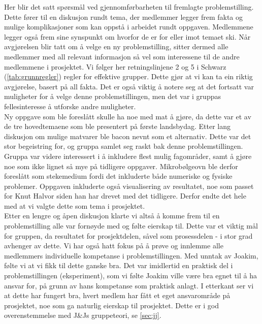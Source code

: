 Her blir det satt spørsmål ved gjennomførbarheten til fremlagte problemstilling. Dette
fører til en diskusjon rundt tema, der medlemmer legger frem fakta og mulige komplikasjoner 
som kan oppstå i arbeidet rundt oppgaven. Medlemmene legger også frem sine
synspunkt om hvorfor de er for eller imot temaet ski. Når avgjørelsen blir tatt
om å velge en ny problemstilling, sitter dermed alle medlemmer med all relevant informasjon så vel som interessene 
til de andre medlemmene i prosjektet. Vi følger her retningslinjene 2 og 5 i
Schwarz (\cref{tab:grunnregler})
regler for effektive grupper. Dette gjør at vi kan ta ein riktig avgjørelse,
basert på all fakta. Det er også 
viktig å notere seg at det fortsatt var muligheter for å velge denne problemstillingen, men 
det var i gruppas fellesinteresse å utforske andre muligheter. \\

Ny oppgave som ble foreslått skulle ha noe med mat å gjøre, da dette var et av
de tre hovedtemaene som ble presentert på første landsbydag. Etter lang
diskusjon om mulige matvarer ble bacon nevnt som et alternativ. Dette var det
stor begeistring for, og gruppa samlet seg raskt bak denne problemstillingen.
Gruppa var videre interessert i å inkludere flest mulig fagområder, samt å
gjøre noe som ikke lignet så mye på tidligere oppgaver. Mikrobølgeovn ble derfor
foreslått som stekemedium fordi det inkluderte både numeriske og fysiske
problemer. Oppgaven inkluderte også visualisering av resultatet, noe som passet for Knut
Halvor siden han har drevet med det tidligere. Derfor endte det hele
med at vi valgte dette som tema i prosjektet.\\

Etter en lengre og åpen diskusjon klarte vi altså å komme frem til en problemstilling 
alle var fornøyde med og følte eierskap til. Dette var et viktig mål for gruppen, 
da resultatet for prosjektdelen, såvel som prosessdelen - i stor 
grad avhenger av dette. Vi har også hatt fokus på å prøve og innlemme alle
medlemmers individuelle kompetanse i problemstillingen. Med unntak av Joakim,
følte vi at vi fikk til dette ganske bra.
Det var imidlertid en praktisk del i problemstillingen (eksperiment), som vi følte Joakim ville være bra egnet 
til å ha ansvar for, på grunn av hans kompetanse som praktisk anlagt.
I etterkant ser vi at dette har fungert bra,
hvert medlem har fått et eget ansvarområde på prosjektet, noe som ga naturlig
eierskap til prosjektet. Dette er i god overenstemmelse med J\&Js gruppeteori,
se \cref{sec:jj}.\\

